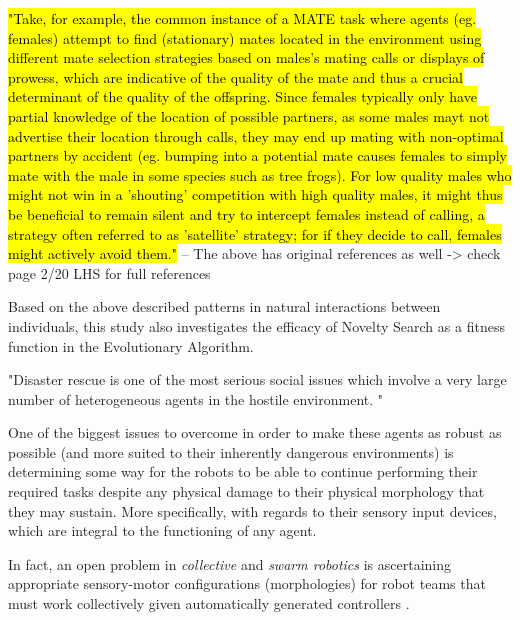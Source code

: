 
\hl{"Take, for example, the common instance of a MATE task where agents (eg. females) attempt to find (stationary) mates located in the environment using different mate selection strategies based on males's mating calls or displays of prowess, which are indicative of the quality of the mate and thus a crucial determinant of the quality of the offspring. Since females typically only have partial knowledge of the location of possible partners, as some males mayt not advertise their location through calls, they may end up mating with non-optimal partners by accident (eg. bumping into a potential mate causes females to simply mate with the male in some species such as tree frogs). For low quality males who might not win in a 'shouting' competition with high quality males, it might thus be beneficial to remain silent and try to intercept females instead of calling, a strategy often referred to as 'satellite' strategy; for if they decide to call, females might actively avoid them."} \cite{ferreira2018accidental}
-- The above has original references as well -> check page 2/20 LHS for full references

Based on the above described patterns in natural interactions between individuals, this study also investigates the efficacy of Novelty Search as a fitness function in the Evolutionary Algorithm.




"Disaster rescue is one of the most serious social issues which involve a very large number of heterogeneous agents in the hostile environment. "\cite{KitanoTadokoro1999}


One of the biggest issues to overcome in order to make these agents as robust as possible (and more suited to their inherently dangerous environments) is determining some way for the robots to be able to continue performing their required tasks despite any physical damage to their physical morphology that they may sustain. More specifically, with regards to their sensory input devices, which are integral to the functioning of any agent.

In fact, an open problem in \textit{collective} \cite{KubeZhang1994B} and \textit{swarm robotics} \cite{Beni2004}
is ascertaining appropriate sensory-motor configurations (morphologies) for robot teams that must work collectively given automatically generated controllers \cite{FloreanoDurrMattiussi2008}.

